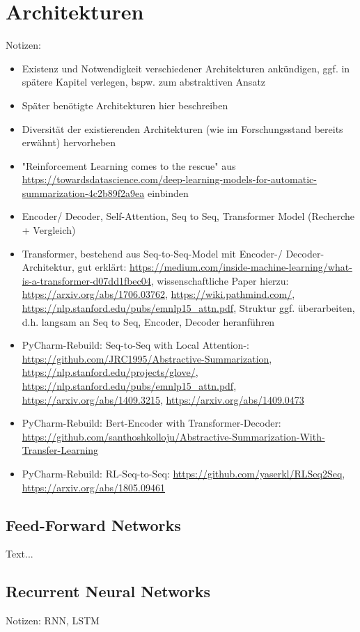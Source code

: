 \section{Architekturen}
Notizen:
\begin{itemize}
	\item Existenz und Notwendigkeit verschiedener Architekturen ankündigen, ggf. in spätere Kapitel verlegen, bspw. zum abstraktiven Ansatz
	\item Später benötigte Architekturen hier beschreiben
	\item Diversität der existierenden Architekturen (wie im Forschungsstand bereits erwähnt) hervorheben
	\item "Reinforcement Learning comes to the rescue" aus \url{https://towardsdatascience.com/deep-learning-models-for-automatic-summarization-4c2b89f2a9ea} einbinden
	\item Encoder/ Decoder, Self-Attention, Seq to Seq, Transformer Model (Recherche + Vergleich)
	\item Transformer, bestehend aus Seq-to-Seq-Model mit Encoder-/ Decoder-Architektur, gut erklärt: \url{https://medium.com/inside-machine-learning/what-is-a-transformer-d07dd1fbec04}, wissenschaftliche Paper hierzu: \url{https://arxiv.org/abs/1706.03762}, \url{https://wiki.pathmind.com/}, \url{https://nlp.stanford.edu/pubs/emnlp15_attn.pdf}, Struktur ggf. überarbeiten, d.h. langsam an Seq to Seq, Encoder, Decoder heranführen
	\item PyCharm-Rebuild: Seq-to-Seq with Local Attention-: \url{https://github.com/JRC1995/Abstractive-Summarization}, \url{https://nlp.stanford.edu/projects/glove/}, \url{https://nlp.stanford.edu/pubs/emnlp15_attn.pdf}, \url{https://arxiv.org/abs/1409.3215}, \url{https://arxiv.org/abs/1409.0473}
	\item PyCharm-Rebuild: Bert-Encoder with Transformer-Decoder: \url{https://github.com/santhoshkolloju/Abstractive-Summarization-With-Transfer-Learning}
	\item PyCharm-Rebuild: RL-Seq-to-Seq: \url{https://github.com/yaserkl/RLSeq2Seq}, \url{https://arxiv.org/abs/1805.09461}
\end{itemize}


\subsection{Feed-Forward Networks}
Text...


\subsection{Recurrent Neural Networks}
Notizen: RNN, LSTM


